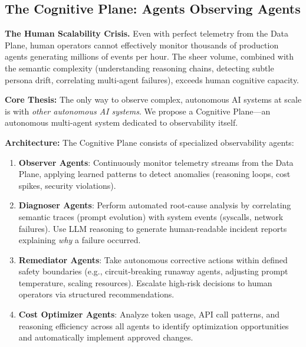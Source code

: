 \documentclass[sigplan,screen，review,9pt]{acmart}
\begin{document}
\subsection{The Cognitive Plane: Agents Observing Agents}

\textbf{The Human Scalability Crisis.} Even with perfect telemetry from the Data Plane, human operators cannot effectively monitor thousands of production agents generating millions of events per hour. The sheer volume, combined with the semantic complexity (understanding reasoning chains, detecting subtle persona drift, correlating multi-agent failures), exceeds human cognitive capacity.

\textbf{Core Thesis:} The only way to observe complex, autonomous AI systems at scale is with \emph{other autonomous AI systems}. We propose a Cognitive Plane—an autonomous multi-agent system dedicated to observability itself.

\textbf{Architecture:} The Cognitive Plane consists of specialized observability agents:

\begin{enumerate}
  \item \textbf{Observer Agents}: Continuously monitor telemetry streams from the Data Plane, applying learned patterns to detect anomalies (reasoning loops, cost spikes, security violations).

  \item \textbf{Diagnoser Agents}: Perform automated root-cause analysis by correlating semantic traces (prompt evolution) with system events (syscalls, network failures). Use LLM reasoning to generate human-readable incident reports explaining \emph{why} a failure occurred.

  \item \textbf{Remediator Agents}: Take autonomous corrective actions within defined safety boundaries (e.g., circuit-breaking runaway agents, adjusting prompt temperature, scaling resources). Escalate high-risk decisions to human operators via structured recommendations.

  \item \textbf{Cost Optimizer Agents}: Analyze token usage, API call patterns, and reasoning efficiency across all agents to identify optimization opportunities and automatically implement approved changes.
\end{enumerate}
\end{document}
